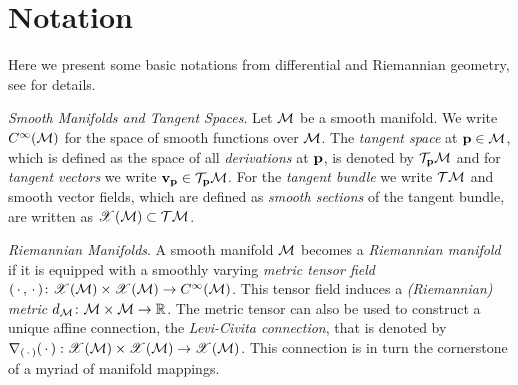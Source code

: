 \section{Notation}
\label{sec:notation}

Here we present some basic notations from differential and Riemannian geometry, see \cite{boothby2003introduction,carmo1992riemannian,lee2013smooth,sakai1996riemannian} for details. 


\textit{Smooth Manifolds and Tangent Spaces}. Let $\mathcal{M}$ be a smooth manifold. We write $C^\infty(\mathcal{M})$ for the space of smooth functions over $\mathcal{M}$. The \emph{tangent space} at $\mathbf{p} \in \mathcal{M}$, which is defined as the space of all \emph{derivations} at $\mathbf{p}$, is denoted by $\mathcal{T}_{\mathbf{p}} \mathcal{M}$ and for \emph{tangent vectors} we write $\mathbf{v}_{\mathbf{p}} \in \mathcal{T}_{\mathbf{p}} \mathcal{M}$. For the \emph{tangent bundle} we write $\mathcal{T}\mathcal{M}$ and smooth vector fields, which are defined as \emph{smooth sections} of the tangent bundle, are written as $\mathscr{X}(\mathcal{M}) \subset \mathcal{T}\mathcal{M}$.

\textit{Riemannian Manifolds}. A smooth manifold $\mathcal{M}$ becomes a \emph{Riemannian manifold} if it is equipped with a smoothly varying \emph{metric tensor field} $(\,\cdot\,, \,\cdot\,) \colon \mathscr{X}(\mathcal{M}) \times \mathscr{X}(\mathcal{M}) \to C^\infty(\mathcal{M})$. This tensor field induces a \emph{(Riemannian) metric} $d_{\mathcal{M}} \colon \mathcal{M}\times\mathcal{M}\to\mathbb{R}$. The metric tensor can also be used to construct a unique affine connection, the \emph{Levi-Civita connection}, that is denoted by $\nabla_{(\,\cdot\,)}(\,\cdot\,) : \mathscr{X}(\mathcal{M}) \times \mathscr{X}(\mathcal{M}) \to \mathscr{X}(\mathcal{M})$. 
This connection is in turn the cornerstone of a myriad of manifold mappings.

